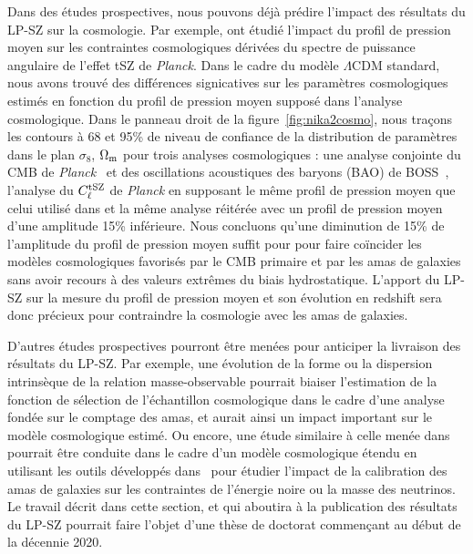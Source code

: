 Dans des études prospectives, nous pouvons déjà prédire l'impact des
résultats du LP-SZ sur la cosmologie. Par exemple, \citet{Ruppin2019b}
ont étudié l'impact du profil de pression moyen sur les contraintes
cosmologiques dérivées du spectre de puissance angulaire de l'effet
tSZ de \emph{Planck}. Dans le cadre du modèle $\Lambda$CDM standard,
nous avons trouvé des différences signicatives sur les paramètres
cosmologiques estimés en fonction du  profil de pression moyen supposé
dans l'analyse cosmologique. Dans le panneau droit de la
figure~\ref{fig:nika2cosmo}, nous traçons les contours à 68 et 95\% de
niveau de confiance de la distribution de paramètres dans le plan
$\sigma_8$, $\Omega_{\rm{m}}$ pour trois analyses cosmologiques :
une analyse conjointe du CMB de
\emph{Planck}~\citep{Planck_2018_cosmo} et des oscillations
acoustiques des baryons (BAO) de BOSS~\citet{Anderson2014}, l'analyse
du $C_\ell^{\rm{tSZ}}$ de \emph{Planck} en supposant le même profil de
pression moyen que celui utilisé dans \citet{Planck2016_ymap} et la
même analyse réitérée avec un profil de pression moyen d'une amplitude
15\% inférieure. Nous concluons qu'une diminution de 15\% de
l'amplitude du profil de pression moyen suffit pour pour faire
coïncider les modèles cosmologiques favorisés par le CMB primaire et
par les amas de galaxies sans avoir recours à des valeurs extrêmes du
biais hydrostatique. L'apport du LP-SZ sur la mesure du profil de
pression moyen et son évolution en redshift sera donc précieux pour
contraindre la cosmologie avec les amas de galaxies. 

D'autres études prospectives pourront être menées pour anticiper la
livraison des résultats du LP-SZ. Par exemple, une évolution de la
forme ou la dispersion intrinsèque de la relation masse-observable
pourrait biaiser l'estimation de la fonction de sélection de
l'échantillon cosmologique dans le cadre d'une analyse fondée
sur le comptage des amas, et aurait ainsi un impact important sur le
modèle cosmologique estimé. Ou encore, une étude similaire à
celle menée dans~\citet{Ruppin2019b} pourrait être conduite dans le
cadre d'un modèle cosmologique étendu en utilisant les outils
développés dans~\citet{Bolliet2018, Bolliet2019} pour étudier l'impact
de la calibration des amas de galaxies sur les contraintes de
l'énergie noire ou la masse des neutrinos.\\

Le travail décrit dans cette section, et qui aboutira à la
publication des résultats du LP-SZ pourrait faire l'objet d'une thèse
de doctorat commençant au début de la décennie 2020. 

